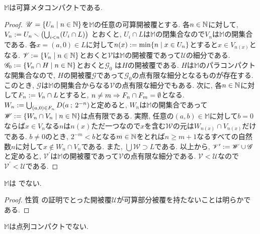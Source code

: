 \documentclass[uplatex, dvipdfmx, a4paper, 12pt, class=jsbook, crop=false]{standalone}
\begin{document}
\begin{property}
	$ \mathbb{M} $は可算メタコンパクトである.
\end{property}

\begin{proof}
	$ \mathscr{U} = \setcomp{U_n}{n \in \N}$を$ \mathbb{M} $の任意の可算開被覆とする. 各$ n \in \mathbb{N} $に対して, $ V_n \mathrel{:=} U_n \smallsetminus \left(\bigcup_{i < n}(U_i \cap L)\right)$
	とおくと, $ U_i \cap L $は$ \mathbb{M} $の閉集合なので$ V_n $は$ \mathbb{M} $の開集合である. 各$ x = (a, 0) \in L $に対して$ n(x) \defeq \min\setcomp{n}{x \in U_n} $とすると$ x \in V_{n(x)} $となる. $ \mathscr{V} \defeq \setcomp{V_n}{n \in \N} $とおくと$ \mathscr{V} $は$ \mathbb{M} $の開被覆であって$ \mathscr{U} $の細分である. $ \mathscr{G}_0 \defeq \setcomp{V_n \cap H}{n \in \N} $とおくと$ \mathscr{G}_0 $
	は$ H $の開被覆である. $ H $は$ \mathbb{M} $のパラコンパクトな開集合なので, $ H $の開被覆$ \mathscr{G} $であって$ \mathscr{G}_0 $の点有限な細分となるものが存在する. このとき, $ \mathscr{G} $は$ \mathbb{M} $の開集合からなる$ \mathscr{V} $の点有限な細分でもある.
	次に, 各$ n \in \mathbb{N} $に対して$ F_n \mathrel{:=} V_n \cap L $とすると, $ n \neq m \Rightarrow F_n \cap F_m = \emptyset $となる. $ W_n \mathrel{:=} \bigcup_{(a, 0) \in F_n}D(a \mathpunct{\: ; \:} 2^{-n}) $と定めると, $ W_n $は$ \mathbb{M} $の開集合であって$ \mathscr{W} \defeq \setcomp{W_n \cap V_n}{n \in \N} $は点有限である. 実際, 任意の$ (a, b) \in \mathbb{M} $に対して$ b = 0 $ならば$ x \in V_n $なる$ n $は$ n(x) $ただ一つなので$ x $を含む$ \mathscr{W} $の元は$ W_{n(x)} \cap V_{n(x)} $だけである. $ b \neq 0 $のとき, $ 2^{-m} < b $となる$ m \in \mathbb{N} $をとれば$ n \geq m+1 $なるすべての自然数$ n $に対して$ x \notin W_n \cap V_n $である. また, $ \bigcup \mathscr{W} \supset L $である. 以上から, $ 
	\mathscr{V}^\prime \mathrel{:=} \mathscr{W} \cup \mathscr{G} $と定めると, $ \mathscr{V}^\prime $は$ \mathbb{M} $の開被覆であって$ \mathscr{V} $の点有限な細分である. $ \mathscr{V} < \mathscr{U} $なので$ \mathscr{V}^\prime < \mathscr{U} $である.
\end{proof}



\begin{property}
	$ \mathbb{M} $は \Lindelof でない.
\end{property}

\begin{proof}
	性質  の証明でとった開被覆$ \mathscr{U} $が可算部分被覆を持たないことは明らかである.
\end{proof}

\begin{property}
	$ \mathbb{M} $は点列コンパクトでない.
\end{property}
\end{document}
